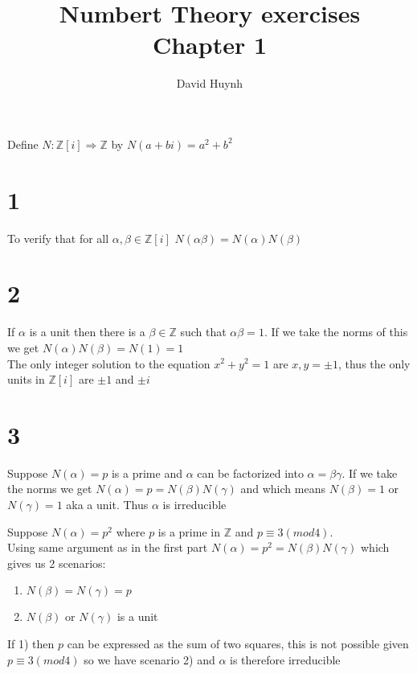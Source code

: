 \documentclass{article}
\begin{document}
\title{Numbert Theory exercises\\Chapter 1}
\author{David Huynh}

\maketitle

Define $N: \mathbb{Z}[i] \Rightarrow \mathbb{Z}$ by $N(a+bi) = a^{2} + b^{2}$

\section*{1}

To verify that for all $\alpha,\beta \in \mathbb{Z}[i]$ $N(\alpha\beta) = N(\alpha)N(\beta)$ 

\section*{2}

If $\alpha$ is a unit then there is a $\beta \in \mathbb{Z}$ such that $\alpha\beta=1$. If we take the norms of this we get $N(\alpha)N(\beta) = N(1) = 1$\\
The only integer solution to the equation $x^{2} + y^{2} = 1$ are $x,y = \pm 1$, thus the only units in $\mathbb{Z}[i]$ are $\pm 1$ and $\pm i$

\section*{3}

Suppose $N(\alpha) = p$ is a prime and $\alpha$ can be factorized into $\alpha = \beta \gamma$. If we take the norms we get $N(\alpha) = p = N(\beta)N(\gamma)$ and  which means $N(\beta)=1$ or $N(\gamma)=1$ aka a unit. Thus $\alpha$ is irreducible

Suppose $N(\alpha) = p^{2}$ where $p$ is a prime in $\mathbb{Z}$ and $p \equiv 3 (mod4)$.\\
Using same argument as in the first part $N(\alpha)=p^{2} = N(\beta)N(\gamma)$ which gives us 2 scenarios:
\begin{enumerate}
	\item $N(\beta) = N(\gamma) = p$
	\item $N(\beta)$ or $N(\gamma)$ is a unit
\end{enumerate}

If 1) then $p$ can be expressed as the sum of two squares, this is not possible given $p \equiv 3(mod4)$ so we have scenario 2) and $\alpha$ is therefore irreducible
\end{document}
